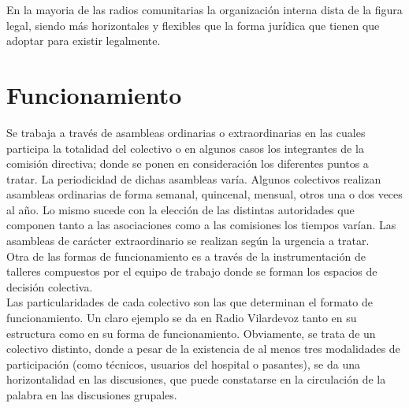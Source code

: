 En la mayoria de las radios comunitarias la organización interna dista de la figura legal, siendo más horizontales y flexibles que la forma jurídica que tienen que adoptar para existir legalmente. 

\section{Funcionamiento}

Se trabaja a través de asambleas ordinarias o extraordinarias en las cuales participa la totalidad del colectivo o en algunos casos los integrantes de la comisión directiva; donde se ponen en consideración los diferentes puntos a tratar. La periodicidad de dichas asambleas varía. Algunos colectivos realizan asambleas ordinarias de forma semanal, quincenal, mensual, otros una o dos veces al año. Lo mismo sucede con la elección de las distintas autoridades que componen tanto a las asociaciones como a las comisiones los tiempos varían. Las asambleas de carácter extraordinario se realizan según la urgencia a tratar.\\

Otra de las formas de funcionamiento es a través de la instrumentación de talleres compuestos por el equipo de trabajo donde se forman los espacios de decisión colectiva.\\

Las particularidades de cada colectivo son las que determinan el formato de funcionamiento. Un claro ejemplo se da en Radio Vilardevoz tanto en su estructura como en su forma de funcionamiento. Obviamente, se trata de un colectivo distinto, donde a pesar de la existencia de al menos tres modalidades de participación (como técnicos, usuarios del hospital o pasantes), se da una horizontalidad en las discusiones, que puede constatarse en la circulación de la palabra en las discusiones grupales.\\

